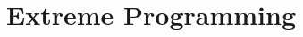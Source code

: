 \documentclass[]{UCD_CS_FYP_Report}
\begin{document}
\maketitle

\tableofcontents{}\newpage
\newpage

\chapter{Extreme Programming}


% 

% 

% 

% 

% 

% 

\newpage


\label{endpage}
\end{document}
